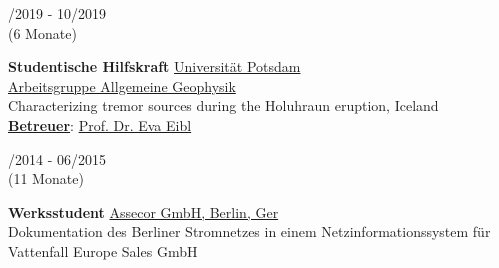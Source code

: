 \documentclass{article}
\newcommand{\spacingWork}{0.25cm}
\begin{document}
\begin{minipage}[t]{0.69\textwidth}
\begin{minipage}[t]{0.99\textwidth}
				\begin{minipage}[t]{0.2\textwidth}
				/2019 - 10/2019 \\(6 Monate)
				\end{minipage}
				\hfill
				\begin{minipage}[t]{0.75\textwidth}
				\textbf{Studentische Hilfskraft}\hfill 
				\href{https://www.geo.uni-potsdam.de/}{\color{pblue}Universität Potsdam}\\
				\href{http://www.geo.uni-potsdam.de/allgemeine-geophysik-1570.html}{Arbeitsgruppe Allgemeine Geophysik}\\
			    Characterizing tremor sources during the Holuhraun eruption, Iceland\\
			    \textbf{\underline{Betreuer}}: \href{mailto:eva.eibl@un-potsdam.de }{\color{pblue}Prof. Dr. Eva Eibl }
				\end{minipage} 
				
%		
				
		\vspace{\spacingWork}
		
		\begin{minipage}[t]{0.2\textwidth}
			/2014 - 06/2015\\(11 Monate)
		\end{minipage}
		\hfill
		\begin{minipage}[t]{0.75\textwidth}
			\textbf{Werksstudent}\hfill
			\href{https://assecor.de/}{\color{pblue}Assecor GmbH, Berlin, Ger}\\
			Dokumentation des Berliner Stromnetzes in einem Netzinformationssystem für Vattenfall Europe Sales GmbH
		\end{minipage}


\end{minipage}
\end{minipage}
\end{document}
